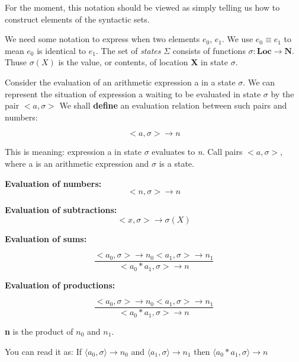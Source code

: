 \documentclass[a4paper, 12pt]{article}
\begin{document}
    For the moment, this notation should be viewed as simply telling us how to construct elements of the syntactic sets.

    We need some notation to express when two elements \textit{$e_0$}, \textit{$e_1$}. 
    We use $e_0 \equiv e_1$ to mean \textit{$e_0$} is identical to \textit{$e_1$}.
    The set of \textit{states} $\Sigma$ consists of functions $\sigma: \textbf{Loc} \rightarrow \textbf{N}$.
    Thuse $\sigma(X)$ is the value, or contents, of location \textbf{X} in state $\sigma$.

    Consider the evaluation of an arithmetic expression a in a state $\sigma$.
    We can represent the situation of expression a waiting to be evaluated in state $\sigma$ by the pair $<a, \sigma>$
    We shall \textbf{define} an evaluation relation between such pairs and numbers:

        \[
            <a, \sigma> \rightarrow n
        \]

    This is meaning: expression a in state $\sigma$ evaluates to \textit{n}.
    Call pairs $<a, \sigma>$, where a is an arithmetic expression and $\sigma$ is a state.

    \textbf{Evaluation of numbers:}
        \[
            <n, \sigma> \rightarrow n
        \]

    \textbf{Evaluation of subtractions:}
        \[
            <x, \sigma> \rightarrow \sigma(X)
        \]

    \textbf{Evaluation of sums:}
    
        \[
            \frac{<a_0, \sigma> \rightarrow n_0 <a_1, \sigma> \rightarrow n_1}{<a_0 * a_1, \sigma> \rightarrow n}
        \]

    \textbf{Evaluation of productions:}

        \[
            \frac{<a_0, \sigma> \rightarrow n_0 <a_1, \sigma> \rightarrow n_1}{<a_0 * a_1, \sigma> \rightarrow n}
        \]

    \textbf{n} is  the product of $n_0$ and $n_1$.

%
You can read it as:
%
If $\langle a_0, \sigma \rangle \rightarrow n_0$ and $\langle a_1, \sigma \rangle \rightarrow n_1$ then $\langle a_0 * a_1, \sigma \rangle \rightarrow n$
\end{document}
